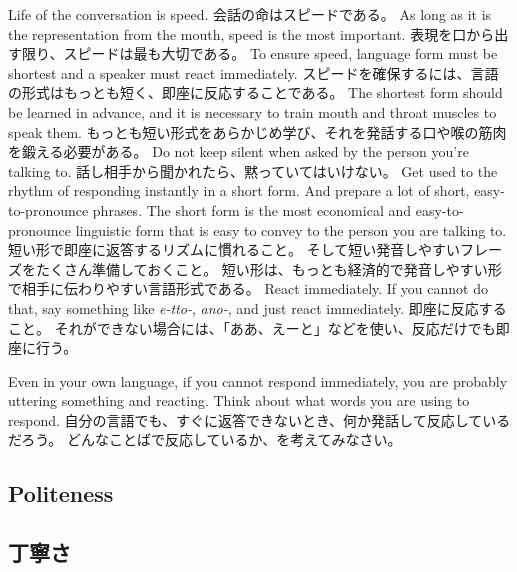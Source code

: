 \documentclass[uplatex,dvipdfmx,b5paper,english,10pt]{jsbook}
\begin{document}
\ifEnglish
Life of the conversation is speed.
\else
会話の命はスピードである。
\fi
\ifEnglish
As long as it is the representation from the mouth, speed is the most important.
\else
表現を口から出す限り、スピードは最も大切である。
\fi
\ifEnglish
To ensure speed, language form must be shortest and a speaker must react immediately.
\else
スピードを確保するには、言語の形式はもっとも短く、即座に反応することである。
\fi
\ifEnglish
The shortest form should be learned in advance, and it is necessary to train mouth and throat muscles to speak them.
\else
もっとも短い形式をあらかじめ学び、それを発話する口や喉の筋肉を鍛える必要がある。
\fi
\ifEnglish
Do not keep silent when asked by the person you're talking to.
\else
話し相手から聞かれたら、黙っていてはいけない。
\fi
\ifEnglish
Get used to the rhythm of responding instantly in a short form.
And prepare a lot of short, easy-to-pronounce phrases.
The short form is the most economical and easy-to-pronounce linguistic form that is easy to convey to the person you are talking to.
\else
短い形で即座に返答するリズムに慣れること。
そして短い発音しやすいフレーズをたくさん準備しておくこと。
短い形は、もっとも経済的で発音しやすい形で相手に伝わりやすい言語形式である。
\fi
\ifEnglish
React immediately.
If you cannot do that, say something like {\it e-tto-\/}, {\it ano-\/}, and just react immediately.
\else
即座に反応すること。
それができない場合には、「ああ、えーと」などを使い、反応だけでも即座に行う。
\fi

\begin{toiquestion}
\ifEnglish
Even in your own language, if you cannot respond immediately, you are probably uttering something and reacting.
Think about what words you are using to respond.
\else
自分の言語でも、すぐに返答できないとき、何か発話して反応しているだろう。
どんなことばで反応しているか、を考えてみなさい。
\fi
\end{toiquestion}


\ifEnglish
\subsection{Politeness}
\else
\subsection{丁寧さ}
\fi
\end{document}
